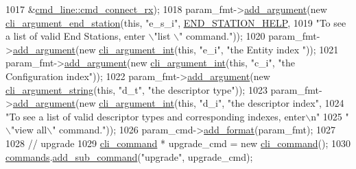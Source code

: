\begin{DoxyCode}
1017         &\hyperlink{classcmd__line_a2c30ba2b18769889b2402e945919e600}{cmd\_line::cmd\_connect\_rx});
1018     param\_fmt->\hyperlink{classcli__command__format_ac3fc6d13a227c195d5ee6f7b78eba9cd}{add\_argument}(\textcolor{keyword}{new} \hyperlink{classcli__argument__end__station}{cli\_argument\_end\_station}(\textcolor{keyword}{this}, \textcolor{stringliteral}{"e\_s\_i"},
       \hyperlink{cmd__line_8cpp_a5ca225cf97165ab1d1472609c4e765f6}{END\_STATION\_HELP},
1019                                                          \textcolor{stringliteral}{"To see a list of valid End Stations, enter \(\backslash\)"list
      \(\backslash\)" command."}));
1020     param\_fmt->\hyperlink{classcli__command__format_ac3fc6d13a227c195d5ee6f7b78eba9cd}{add\_argument}(\textcolor{keyword}{new} \hyperlink{classcli__argument__int}{cli\_argument\_int}(\textcolor{keyword}{this}, \textcolor{stringliteral}{"e\_i"}, \textcolor{stringliteral}{"the Entity index
      "}));
1021     param\_fmt->\hyperlink{classcli__command__format_ac3fc6d13a227c195d5ee6f7b78eba9cd}{add\_argument}(\textcolor{keyword}{new} \hyperlink{classcli__argument__int}{cli\_argument\_int}(\textcolor{keyword}{this}, \textcolor{stringliteral}{"c\_i"}, \textcolor{stringliteral}{"the
       Configuration index"}));
1022     param\_fmt->\hyperlink{classcli__command__format_ac3fc6d13a227c195d5ee6f7b78eba9cd}{add\_argument}(\textcolor{keyword}{new} \hyperlink{classcli__argument__string}{cli\_argument\_string}(\textcolor{keyword}{this}, \textcolor{stringliteral}{"d\_t"}, \textcolor{stringliteral}{"the
       descriptor type"}));
1023     param\_fmt->\hyperlink{classcli__command__format_ac3fc6d13a227c195d5ee6f7b78eba9cd}{add\_argument}(\textcolor{keyword}{new} \hyperlink{classcli__argument__int}{cli\_argument\_int}(\textcolor{keyword}{this}, \textcolor{stringliteral}{"d\_i"}, \textcolor{stringliteral}{"the descriptor
       index"},
1024                                                  \textcolor{stringliteral}{"To see a list of valid descriptor types and corresponding
       indexes, enter\(\backslash\)n"}
1025                                                  \textcolor{stringliteral}{"\(\backslash\)"view all\(\backslash\)" command."}));
1026     param\_cmd->\hyperlink{classcli__command_aa9ec38e761644d946f8db2b920e39921}{add\_format}(param\_fmt);
1027 
1028     \textcolor{comment}{// upgrade}
1029     \hyperlink{classcli__command}{cli\_command} * upgrade\_cmd = \textcolor{keyword}{new} \hyperlink{classcli__command}{cli\_command}();
1030     \hyperlink{classcmd__line_ae4fea670c2fdd2b60f7b5b6ad6fbaf1e}{commands}.\hyperlink{classcli__command_aa73a67e8ebb6facd4b40ced66279b226}{add\_sub\_command}(\textcolor{stringliteral}{"upgrade"}, upgrade\_cmd);

\end{DoxyCode}
